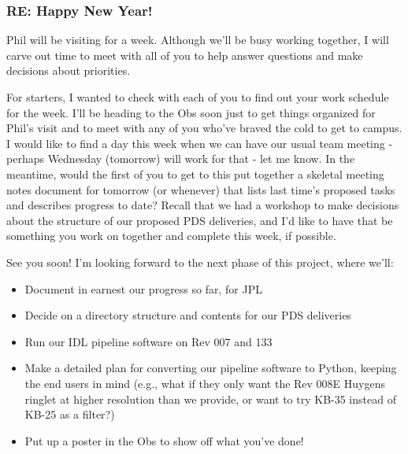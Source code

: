 \documentclass[crop=false,class=article,oneside]{standalone}
\begin{document}
\subsubsection{\footnotesize RE: Happy New Year!}
Phil will be visiting for a week. Although we'll be busy working together, I will carve out time to meet with all of you to help answer questions and make decisions about priorities.\par
For starters, I wanted to check with each of you to find out your work schedule for the week. I'll be heading to the Obs soon just to get things organized for Phil's visit and to meet with any of you who've braved the cold to get to campus. I would like to find a day this week when we can have our usual team meeting - perhaps Wednesday (tomorrow) will work for that - let me know. 
In the meantime, would the first of you to get to this put together a skeletal meeting notes document for tomorrow (or whenever) that lists last time's proposed tasks and describes progress to date? Recall that we had a workshop to make decisions about the structure of our proposed PDS deliveries, and I'd like to have that be something you work on together and complete this week, if possible.\par
See you soon! I'm looking forward to the next phase of this project, where we'll:
\begin{itemize}
    \item Document in earnest our progress so far, for JPL
    \item Decide on a directory structure and contents for our PDS deliveries
    \item Run our IDL pipeline software on Rev 007 and 133
    \item Make a detailed plan for converting our pipeline software to Python, keeping the end users in mind (e.g., what if they only want the Rev 008E Huygens ringlet at higher resolution than we provide, or want to try KB-35 instead of KB-25 as a filter?)
    \item Put up a poster in the Obs to show off what you've done!
\end{itemize}
\end{document}
